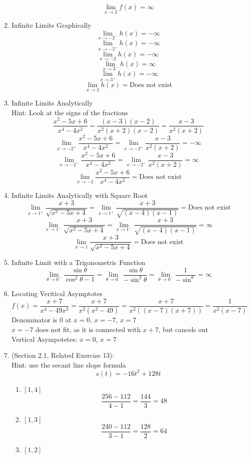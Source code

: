 \documentclass{article}
\begin{document}
\begin{enumerate}
		$$\lim_{x \to 2}{f(x)} = \infty$$
	\item Infinite Limits Graphically
		$$\lim_{x \to -2^-}{h(x)} = - \infty$$
		$$\lim_{x \to -2^+}{h(x)} = - \infty$$
		$$\lim_{x \to -2}{h(x)} = - \infty$$
		$$\lim_{x \to 3^-}{h(x)} = \infty$$
		$$\lim_{x \to 3^+}{h(x)} = - \infty$$
		$$\lim_{x \to 3}{h(x)} = \text{Does not exist}$$
	\item Infinite Limits Analytically
		\\ Hint: Look at the signs of the fractions
		$$\frac{x^2-5x+6}{x^4-4x^2} = \frac{(x - 3)(x - 2)}{x^2(x + 2)(x - 2)} = \frac{x-3}{x^2(x+2)}$$
		$$\lim_{x \to -2^+}{\frac{x^2 - 5x + 6}{x^4 - 4x^2}} = \lim_{x \to -2^+}{\frac{x-3}{x^2(x+2)}} = - \infty$$
		$$\lim_{x \to -2^-}{\frac{x^2 - 5x + 6}{x^4 - 4x^2}} = \lim_{x \to -2^-}{\frac{x-3}{x^2(x+2)}} = \infty$$
		$$\lim_{x \to -2}{\frac{x^2 - 5x + 6}{x^4 - 4x^2}} = \text{Does not exist}$$
	\item Infinite Limits Analytically with Square Root
		$$\lim_{x \to 1^+}{\frac{x + 3}{\sqrt{x^2 - 5x + 4}}} = \lim_{x \to 1^+}{\frac{x + 3}{\sqrt{(x-4)(x-1)}}} = \text{Does not exist}$$
		$$\lim_{x \to 1^-}{\frac{x + 3}{\sqrt{x^2 - 5x + 4}}} = \lim_{x \to 1^-}{\frac{x + 3}{\sqrt{(x-4)(x-1)}}} = \infty$$
		$$\lim_{x \to 1}{\frac{x + 3}{\sqrt{x^2 - 5x + 4}}} = \text{Does not exist}$$
	\item Infinite Limit with a Trigonometric Function
		$$\lim_{\theta \to 0^-}{\frac{\sin{\theta}}{\cos^2{\theta} - 1}} = \lim_{\theta \to 0^-}{\frac{\sin{\theta}}{- \sin^2{\theta}}} = \lim_{\theta \to 0^-}{\frac{1}{- \sin^{\theta}}} = \infty$$
	\item Locating Veritical Asymptotes
		$$f(x) = \frac{x + 7}{x^4 - 49x^2} = \frac{x+7}{x^2(x^2-49)} = \frac{x+7}{x^2((x-7)(x+7))} = \frac{1}{x^2(x-7)}$$
		Denominator is $0$ at $x=0$, $x=-7$, $x=7$ \\
		$x=-7$ does not fit, as it is connected with $x+7$, but cancels out \\
		Vertical Asympotetes: $x = 0$, $x = 7$
    \item (Section 2.1, Related Exercise 13):
    	\\Hint: use the secant line slope formula
    	$$s(t) = -16t^2 + 128t$$
        \begin{enumerate}
    	    \item $[1, 4]$
    	        $$\frac{256 - 112}{4 - 1} = \frac{144}{3} = 48$$
    	    \item $[1, 3]$
    	        $$\frac{240 - 112}{3 - 1} = \frac{128}{2} = 64$$
    	    \item $[1, 2]$

\end{enumerate}
\end{enumerate}
\end{document}
